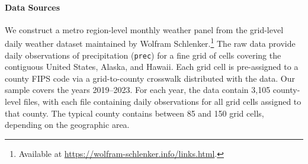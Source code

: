 \documentclass[12pt]{article}
\begin{document}
\paragraph{Data Sources} We construct a metro region-level monthly weather panel from the grid-level daily weather
dataset maintained by Wolfram Schlenker.\footnote{Available at
\url{https://wolfram-schlenker.info/links.html}.} The raw data provide daily observations of precipitation (\texttt{prec}) for a fine grid of cells covering the contiguous United States, Alaska, and Hawaii. Each grid cell is
pre-assigned to a county FIPS code via a grid-to-county crosswalk distributed  with the data. Our sample covers the years 2019--2023. For each year, the data contain
3,105 county-level files, with each file containing daily observations for all grid cells assigned to that county. The typical county contains between 85 and
150 grid cells, depending on the geographic area.
\end{document}
